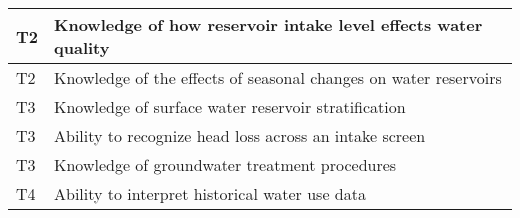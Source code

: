 \begin{table}[H]
\begin{tabular}{| m{1cm} |m{15cm} |}
T2 & Knowledge of how   reservoir intake level effects water quality                                                                   \\ \hline
T2 & Knowledge of the   effects of seasonal changes on water reservoirs                                                                \\ \hline
T3 & Knowledge of surface   water reservoir stratification                                                                             \\ \hline
T3 & Ability to recognize   head loss across an intake screen                                                                          \\ \hline
T3 & Knowledge of   groundwater treatment procedures                                                                                   \\ \hline

T4 & Ability to interpret historical water use data                                                                                   \\ \hline
\end{tabular}
\end{table}

\newpage







































